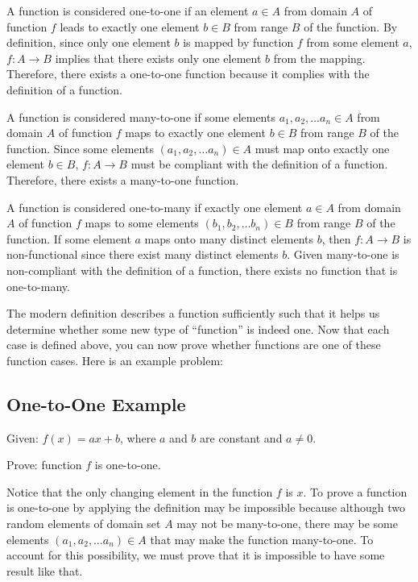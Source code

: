 
A function is considered one-to-one if an element $a \in A$ from domain $A$ of function $f$ leads to exactly one element $b \in B$ from range $B$ of the function. By definition, since only one element $b$ is mapped by function $f$ from some element $a$, $f:A \to B$ implies that there exists only one element $b$ from the mapping. Therefore, there exists a one-to-one function because it complies with the definition of a function. 

A function is considered many-to-one if some elements $a_1, a_2, \ldots a_n \in A$ from domain $A$ of function $f$ maps to exactly one element $b \in B$ from range $B$ of the function. Since some elements $(a_1, a_2, \ldots a_n) \in A$ must map onto exactly one element $b \in B$, $f:A \to B$ must be compliant with the definition of a function. Therefore, there exists a many-to-one function.

A function is considered one-to-many if exactly one element $a \in A$ from domain $A$ of function $f$ maps to some elements $(b_1, b_2, \ldots b_n) \in B$ from range $B$ of the function. If some element $a$ maps onto many distinct elements $b$, then $f:A \to B$ is non-functional since there exist many distinct elements $b$. Given many-to-one is non-compliant with the definition of a function, there exists no function that is one-to-many.

The modern definition describes a function sufficiently such that it helps us determine
whether some new type of ``function'' is indeed one. Now that each case is defined above,
you can now prove whether functions are one of these function cases. Here is an example
problem:

\subsection{One-to-One Example}
\label{sss:onet-5bc6}

Given: $f(x) = ax + b$, where $a$ and $b$ are constant and $a \neq 0$.

Prove: function $f$ is one-to-one.

Notice that the only changing element in the function $f$ is $x$. To prove a function is one-to-one by applying the definition may be impossible because although two random elements of domain set $A$ may not be many-to-one, there may be some elements $(a_1, a_2, \ldots a_n) \in A$ that may make the function many-to-one. To account for this possibility, we must prove that it is impossible to have some result like that.

